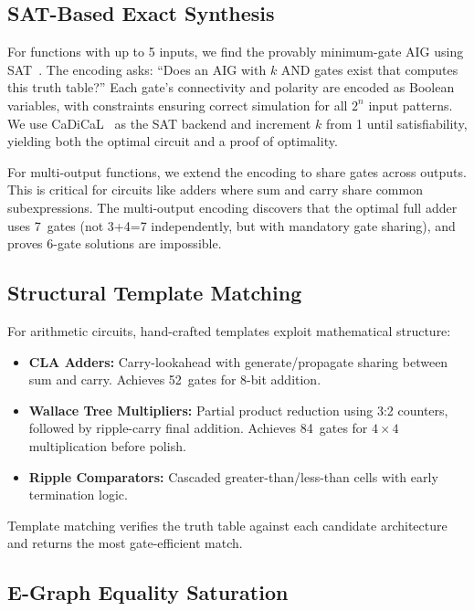 \documentclass[conference,10pt]{IEEEtran}
\begin{document}
\subsection{SAT-Based Exact Synthesis}

For functions with up to 5 inputs, we find the provably minimum-gate AIG using SAT~\cite{haaswijk2020}. The encoding asks: ``Does an AIG with $k$ AND gates exist that computes this truth table?'' Each gate's connectivity and polarity are encoded as Boolean variables, with constraints ensuring correct simulation for all $2^n$ input patterns. We use CaDiCaL~\cite{cadical} as the SAT backend and increment $k$ from 1 until satisfiability, yielding both the optimal circuit and a proof of optimality.

For multi-output functions, we extend the encoding to share gates across outputs. This is critical for circuits like adders where sum and carry share common subexpressions. The multi-output encoding discovers that the optimal full adder uses 7~gates (not 3+4=7 independently, but with mandatory gate sharing), and proves 6-gate solutions are impossible.

\subsection{Structural Template Matching}

For arithmetic circuits, hand-crafted templates exploit mathematical structure:

\begin{itemize}
    \item \textbf{CLA Adders:} Carry-lookahead with generate/propagate sharing between sum and carry. Achieves 52~gates for 8-bit addition.
    \item \textbf{Wallace Tree Multipliers:} Partial product reduction using 3:2 counters, followed by ripple-carry final addition. Achieves 84~gates for $4\times4$ multiplication before polish.
    \item \textbf{Ripple Comparators:} Cascaded greater-than/less-than cells with early termination logic.
\end{itemize}

Template matching verifies the truth table against each candidate architecture and returns the most gate-efficient match.

\subsection{E-Graph Equality Saturation}
\end{document}
